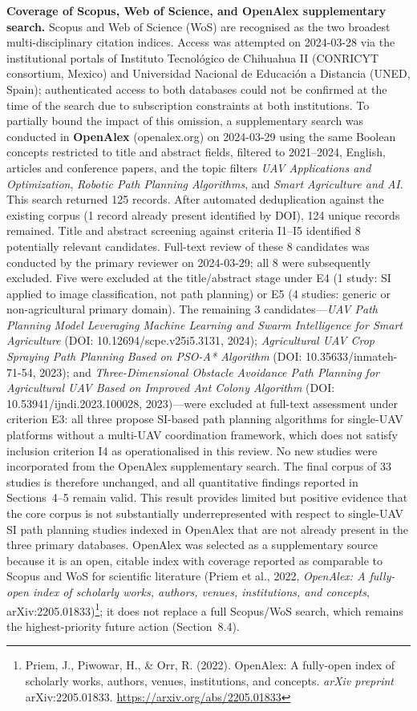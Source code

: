 \documentclass[review,3p,times]{elsarticle}
\begin{document}
\textbf{Coverage of Scopus, Web of Science, and OpenAlex supplementary search.} Scopus and Web of Science (WoS) are recognised as the two broadest multi-disciplinary citation indices. Access was attempted on 2024-03-28 via the institutional portals of Instituto Tecnológico de Chihuahua II (CONRICYT consortium, Mexico) and Universidad Nacional de Educación a Distancia (UNED, Spain); authenticated access to both databases could not be confirmed at the time of the search due to subscription constraints at both institutions. To partially bound the impact of this omission, a supplementary search was conducted in \textbf{OpenAlex} (openalex.org) on 2024-03-29 using the same Boolean concepts restricted to title and abstract fields, filtered to 2021--2024, English, articles and conference papers, and the topic filters \textit{UAV Applications and Optimization}, \textit{Robotic Path Planning Algorithms}, and \textit{Smart Agriculture and AI}. This search returned 125 records. After automated deduplication against the existing corpus (1 record already present identified by DOI), 124 unique records remained. Title and abstract screening against criteria I1--I5 identified 8 potentially relevant candidates. Full-text review of these 8 candidates was conducted by the primary reviewer on 2024-03-29; all 8 were subsequently excluded. Five were excluded at the title/abstract stage under E4 (1 study: SI applied to image classification, not path planning) or E5 (4 studies: generic or non-agricultural primary domain). The remaining 3 candidates---\textit{UAV Path Planning Model Leveraging Machine Learning and Swarm Intelligence for Smart Agriculture} (DOI: 10.12694/scpe.v25i5.3131, 2024); \textit{Agricultural UAV Crop Spraying Path Planning Based on PSO-A* Algorithm} (DOI: 10.35633/inmateh-71-54, 2023); and \textit{Three-Dimensional Obstacle Avoidance Path Planning for Agricultural UAV Based on Improved Ant Colony Algorithm} (DOI: 10.53941/ijndi.2023.100028, 2023)---were excluded at full-text assessment under criterion E3: all three propose SI-based path planning algorithms for single-UAV platforms without a multi-UAV coordination framework, which does not satisfy inclusion criterion I4 as operationalised in this review. No new studies were incorporated from the OpenAlex supplementary search. The final corpus of 33 studies is therefore unchanged, and all quantitative findings reported in Sections~4--5 remain valid. This result provides limited but positive evidence that the core corpus is not substantially underrepresented with respect to single-UAV SI path planning studies indexed in OpenAlex that are not already present in the three primary databases. OpenAlex was selected as a supplementary source because it is an open, citable index with coverage reported as comparable to Scopus and WoS for scientific literature (Priem et al., 2022, \textit{OpenAlex: A fully-open index of scholarly works, authors, venues, institutions, and concepts}, arXiv:2205.01833)\footnote{Priem, J., Piwowar, H., \& Orr, R. (2022). OpenAlex: A fully-open index of scholarly works, authors, venues, institutions, and concepts. \textit{arXiv preprint} arXiv:2205.01833. \url{https://arxiv.org/abs/2205.01833}}; it does not replace a full Scopus/WoS search, which remains the highest-priority future action (Section~8.4).
\end{document}
